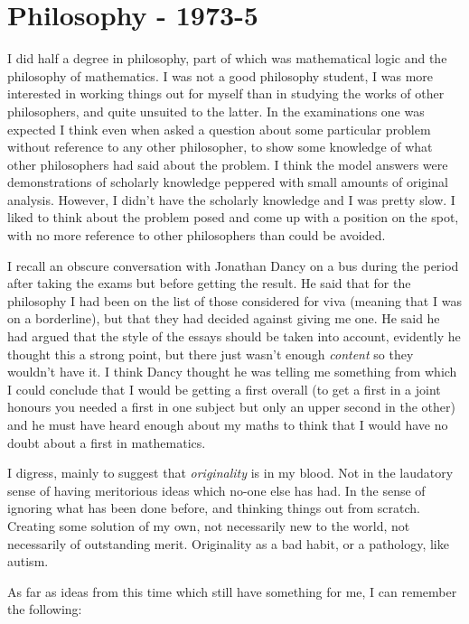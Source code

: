\documentclass[10pt,titlepage]{book}
\begin{document}
\section{Philosophy - 1973-5}

I did half a degree in philosophy, part of which was mathematical logic and the philosophy of mathematics.
I was not a good philosophy student, I was more interested in working things out for myself than in studying the works of other philosophers, and quite unsuited to the latter.
In the examinations one was expected I think even when asked a question about some particular problem without reference to any other philosopher, to show some knowledge of what other philosophers had said about the problem.
I think the model answers were demonstrations of scholarly knowledge peppered with small amounts of original analysis.
However, I didn't have the scholarly knowledge and I was pretty slow.
I liked to think about the problem posed and come up with a position on the spot, with no more reference to other philosophers than could be avoided.

I recall an obscure conversation with Jonathan Dancy on a bus during the period after taking the exams but before getting the result.
He said that for the philosophy I had been on the list of those considered for viva (meaning that I was on a borderline), but that they had decided against giving me one.
He said he had argued that the style of the essays should be taken into account, evidently he thought this a strong point, but there just wasn't enough {\it content} so they wouldn't have it.
I think Dancy thought he was telling me something from which I could conclude that I would be getting a first overall (to get a first in a joint honours you needed a first in one subject but only an upper second in the other) and he must have heard enough about my maths to think that I would have no doubt about a first in mathematics.

I digress, mainly to suggest that {\it originality} is in my blood.
Not in the laudatory sense of having meritorious ideas which no-one else has had.
In the sense of ignoring what has been done before, and thinking things out from scratch.
Creating some solution of my own, not necessarily new to the world, not necessarily of outstanding merit.
Originality as a bad habit, or a pathology, like autism.

As far as ideas from this time which still have something for me, I can remember the following:
\end{document}

